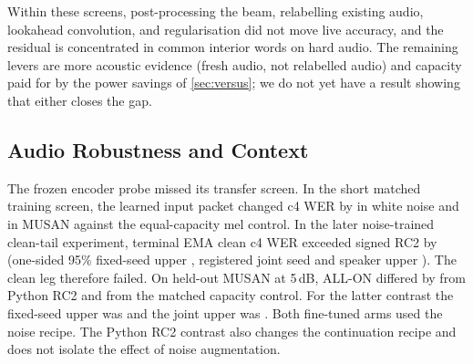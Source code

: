  Within these screens, post-processing the beam, relabelling existing audio, lookahead convolution, and
regularisation did not move live accuracy, and the residual is concentrated in common interior words on hard audio. The remaining
levers are more acoustic evidence (fresh audio, not relabelled audio) and capacity paid for by the power savings of \cref{sec:versus}; we do not
yet have a result showing that either closes the gap.

\subsection{Audio Robustness and Context}\label{sec:vfive}

 The frozen encoder probe missed its transfer
screen. In the short matched training screen, the learned input packet changed
c4 WER by \AudioProbeWhiteGain\pp{} in white noise and \AudioProbeMusanGain\pp{}
in MUSAN against the equal-capacity mel control. In the later noise-trained
clean-tail experiment, terminal EMA clean c4 WER exceeded signed RC2 by
\AudioHSixtyOneCleanDelta\pp{} (one-sided 95\% fixed-seed upper \AudioHSixtyOneCleanFixed\pp{},
registered joint seed and speaker upper \AudioHSixtyOneCleanJoint\pp{}).
The clean leg therefore failed. On held-out MUSAN at 5\,dB, ALL-ON differed by
\AudioHSixtyOneNoisePython\pp{} from Python RC2 and \AudioHSixtyOneNoiseDelta\pp{}
from the matched capacity control. For the latter contrast the fixed-seed upper
was \AudioHSixtyOneNoiseFixed\pp{} and the joint upper was \AudioHSixtyOneNoiseJoint\pp{}.
Both fine-tuned arms used the noise recipe. The Python RC2 contrast also changes
the continuation recipe and does not isolate the effect of noise augmentation.

